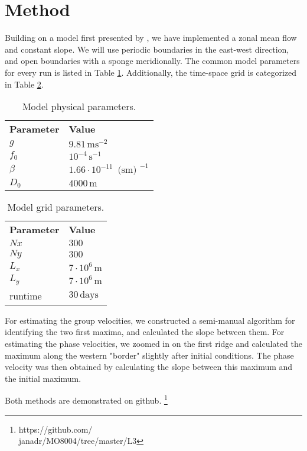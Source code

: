 \section{Method}
\label{sec:method}

Building on a model first presented by \citet{lab1}, we have implemented a zonal mean flow and constant slope. We will use periodic boundaries in the east-west direction, and open boundaries with a sponge meridionally. The common model parameters for every run is listed in Table \ref{tab:parameters}. Additionally, the time-space grid is categorized in Table \ref{tab:grid}.
	\begin{table}[htbp]
		\begin{tabular}{ll}
			\textbf{Parameter} & \textbf{Value} \\
			$ g $ & $ 9.81 \, \text{m}\text{s}^{-2} $ \\
			$ f_0 $ & $ 10^{-4} \, \text{s}^{-1}$ \\
			$ \beta $ & $ 1.66 \cdot 10^{-11} \, \text{ (sm) }^{-1}  $ \\
			$ D_0 $ & $ 4000 \, \text{m}$
		\end{tabular}
		\caption{Model physical parameters.}
		\label{tab:parameters}
	\end{table}

	\begin{table}[htbp]
		\begin{tabular}{ll}
			\textbf{Parameter} & \textbf{Value} \\
			$ Nx $ & $ 300 $\\
			$ Ny $ & $ 300 $\\
			$ L_x $ & $ 7 \cdot 10^6 \, \text{m} $\\
			$ L_y $ & $ 7 \cdot 10^6 \, \text{m} $\\
			runtime & $ 30 \, \text{days} $
		\end{tabular}
		\caption{Model grid parameters.}
		\label{tab:grid}
	\end{table}

For estimating the group velocities, we constructed a semi-manual algorithm for identifying the two first maxima, and calculated the slope between them. For estimating the phase velocities, we zoomed in on the first ridge and calculated the maximum along the western "border" slightly after initial conditions. The phase velocity was then obtained by calculating the slope between this maximum and the initial maximum.

Both methods are demonstrated on github. \footnote{https://github.com/ \\janadr/MO8004/tree/master/L3}